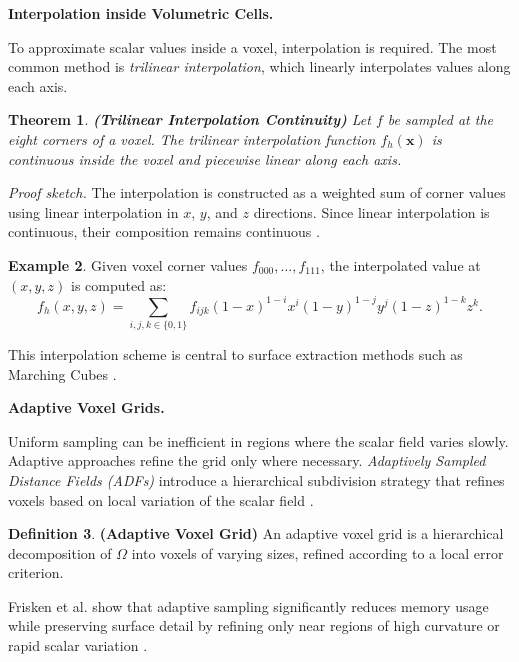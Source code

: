 \documentclass[12pt, a4paper, oneside]{book}
\theoremstyle{plain}
\newtheorem{theorem}{Theorem}[chapter]
\theoremstyle{definition}
\newtheorem{definition}[theorem]{Definition}
\newtheorem{example}[theorem]{Example}
\theoremstyle{remark}
\theoremstyle{definition}
\begin{document}
\vspace{0.5em}

\textbf{Interpolation inside Volumetric Cells.}

To approximate scalar values inside a voxel, interpolation is required. The most common method is \emph{trilinear interpolation}, which linearly interpolates values along each axis.

\begin{theorem}
    \textbf{(Trilinear Interpolation Continuity)}
Let $f$ be sampled at the eight corners of a voxel. The trilinear interpolation function $f_h(\mathbf{x})$ is continuous inside the voxel and piecewise linear along each axis.
\end{theorem}


\textit{Proof sketch.} The interpolation is constructed as a weighted sum of corner values using linear interpolation in $x$, $y$, and $z$ directions. Since linear interpolation is continuous, their composition remains continuous \cite{lorensen1998marching}.

\begin{example}
    Given voxel corner values $f_{000}, \dots, f_{111}$, the interpolated value at $(x,y,z)$ is computed as:
\[
f_h(x,y,z) = \sum_{i,j,k \in \{0,1\}} f_{ijk}(1-x)^{1-i}x^i(1-y)^{1-j}y^j(1-z)^{1-k}z^k.
\]
\end{example}


This interpolation scheme is central to surface extraction methods such as Marching Cubes \cite{lorensen1998marching}.

\vspace{0.5em}

\textbf{Adaptive Voxel Grids.}

Uniform sampling can be inefficient in regions where the scalar field varies slowly. Adaptive approaches refine the grid only where necessary. \emph{Adaptively Sampled Distance Fields (ADFs)} introduce a hierarchical subdivision strategy that refines voxels based on local variation of the scalar field \cite{frisken2000adaptively}.

\begin{definition}
    \textbf{(Adaptive Voxel Grid)}
An adaptive voxel grid is a hierarchical decomposition of $\Omega$ into voxels of varying sizes, refined according to a local error criterion.
\end{definition}


Frisken et al. show that adaptive sampling significantly reduces memory usage while preserving surface detail by refining only near regions of high curvature or rapid scalar variation \cite{frisken2000adaptively}.
\end{document}
